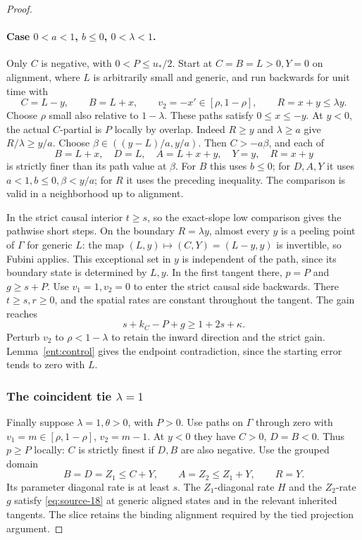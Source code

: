 \begin{proof}
\paragraph{Case \(0<a<1\), \(b\le0\), \(0<\lambda<1\).}
Only \(C\) is negative, with \(0<P\le u_*/2\).
Start at \(C=B=L>0,Y=0\) on alignment, where \(L\) is
arbitrarily small and generic, and run backwards for unit time with
\begin{equation}\label{eq:source-27}
C=L-y,\qquad B=L+x,\qquad
v_2=-x'\in[\rho,1-\rho],\qquad R=x+y\le\lambda y.
\end{equation}
Choose \(\rho\) small also relative to \(1-\lambda\).
These paths satisfy \(0\le x\le-y\). At \(y<0\), the
actual \(C\)-partial is \(P\) locally by overlap.
Indeed \(R\ge y\) and \(\lambda\ge a\) give
\(R/\lambda\ge y/a\). Choose
\(\beta\in((y-L)/a,y/a)\). Then \(C>-a\beta\), and
each of
\[
B=L+x,\quad D=L,\quad A=L+x+y,\quad Y=y,\quad R=x+y
\]
is strictly finer than its path value at \(\beta\).
For \(B\) this uses \(b\le0\); for \(D,A,Y\) it uses
\(a<1,b\le0,\beta<y/a\); for \(R\) it uses the
preceding inequality. The comparison is valid in a neighborhood
up to alignment.

In the strict causal interior \(t\ge s\), so the exact-slope
low comparison gives the pathwise short steps. On the boundary
\(R=\lambda y\), almost every \(y\) is a peeling point of
\(\Gamma\) for generic \(L\): the map
\((L,y)\mapsto(C,Y)=(L-y,y)\) is invertible, so Fubini
applies. This exceptional set in \(y\) is independent of the
path, since its boundary state is determined by \(L,y\).
In the first tangent there, \(p=P\) and \(g\ge s+P\).
Use \(v_1=1,v_2=0\) to enter the strict causal side
backwards. There \(t\ge s,r\ge0\), and the spatial rates
are constant throughout the tangent. The gain reaches
\[
s+k_C-P+g\ge1+2s+\kappa.
\]
Perturb \(v_2\) to \(\rho<1-\lambda\) to retain the
inward direction and the strict gain. Lemma~\ref{ent:control}
gives the endpoint contradiction, since the starting error tends
to zero with \(L\).

\subsubsection*{The coincident tie \(\lambda=1\)}

Finally suppose \(\lambda=1,\theta>0\), with \(P>0\).
Use paths on \(\Gamma\) through zero with
\(v_1=m\in[\rho,1-\rho]\), \(v_2=m-1\).
At \(y<0\) they have \(C>0\), \(D=B<0\).
Thus \(p\ge P\) locally: \(C\) is strictly finest if
\(D,B\) are also negative. Use the grouped domain
\[
B=D=Z_1\le C+Y,\qquad A=Z_2\le Z_1+Y,\qquad R=Y.
\]
Its parameter diagonal rate is at least \(s\).
The \(Z_1\)-diagonal rate \(H\) and the \(Z_2\)-rate
\(g\) satisfy \eqref{eq:source-18} at generic aligned
states and in the relevant inherited tangents. The slice retains
the binding alignment required by the tied projection argument.


\end{proof}

